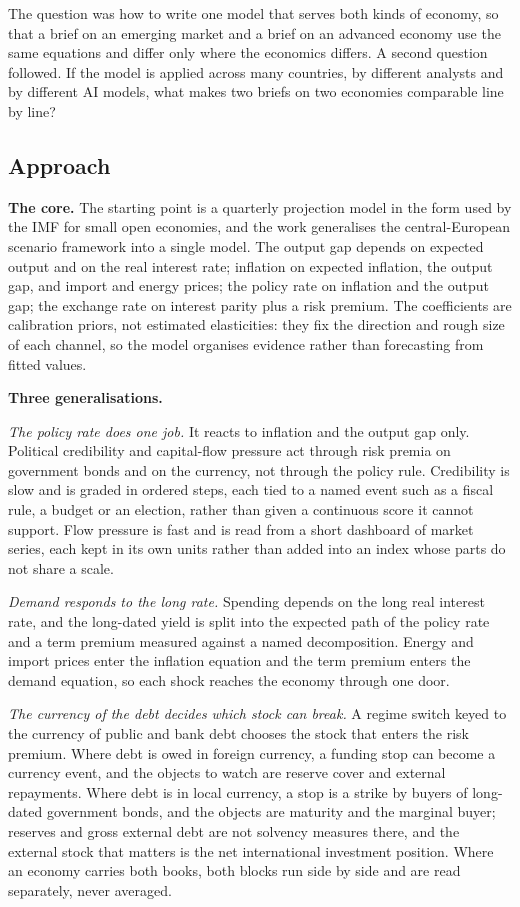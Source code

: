 \documentclass[
  british,
  a4paper,
]{article}
\begin{document}
The question was how to write one model that serves both kinds of
economy, so that a brief on an emerging market and a brief on an
advanced economy use the same equations and differ only where the
economics differs. A second question followed. If the model is applied
across many countries, by different analysts and by different AI models,
what makes two briefs on two economies comparable line by line?

\subsection{Approach}\label{approach}

\textbf{The core.} The starting point is a quarterly projection model in
the form used by the IMF for small open economies, and the work
generalises the central-European scenario framework into a single model.
The output gap depends on expected output and on the real interest rate;
inflation on expected inflation, the output gap, and import and energy
prices; the policy rate on inflation and the output gap; the exchange
rate on interest parity plus a risk premium. The coefficients are
calibration priors, not estimated elasticities: they fix the direction
and rough size of each channel, so the model organises evidence rather
than forecasting from fitted values.

\textbf{Three generalisations.}

\emph{The policy rate does one job.} It reacts to inflation and the
output gap only. Political credibility and capital-flow pressure act
through risk premia on government bonds and on the currency, not through
the policy rule. Credibility is slow and is graded in ordered steps,
each tied to a named event such as a fiscal rule, a budget or an
election, rather than given a continuous score it cannot support. Flow
pressure is fast and is read from a short dashboard of market series,
each kept in its own units rather than added into an index whose parts
do not share a scale.

\emph{Demand responds to the long rate.} Spending depends on the long
real interest rate, and the long-dated yield is split into the expected
path of the policy rate and a term premium measured against a named
decomposition. Energy and import prices enter the inflation equation and
the term premium enters the demand equation, so each shock reaches the
economy through one door.

\emph{The currency of the debt decides which stock can break.} A regime
switch keyed to the currency of public and bank debt chooses the stock
that enters the risk premium. Where debt is owed in foreign currency, a
funding stop can become a currency event, and the objects to watch are
reserve cover and external repayments. Where debt is in local currency,
a stop is a strike by buyers of long-dated government bonds, and the
objects are maturity and the marginal buyer; reserves and gross external
debt are not solvency measures there, and the external stock that
matters is the net international investment position. Where an economy
carries both books, both blocks run side by side and are read
separately, never averaged.
\end{document}

